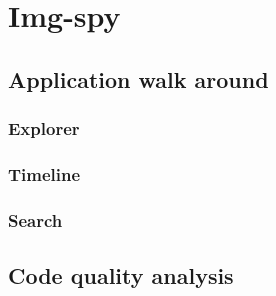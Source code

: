 \chapter{Img-spy}

\section{Application walk around}

\subsection{Explorer}

\subsection{Timeline}

\subsection{Search}

\section{Code quality analysis}
